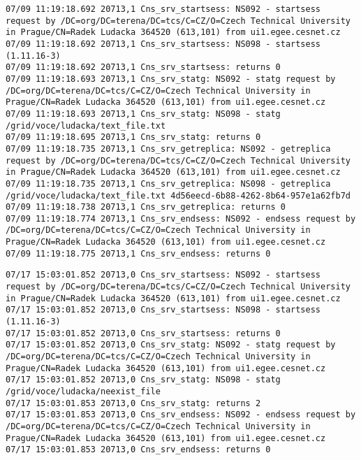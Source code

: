 \documentclass[a4paper, 11pt]{article} %
\begin{document}
\begin{lstlisting}[label={log:cp1},caption={lcg-cp --vo voce lfn:/grid/voce/ludacka/text\_file.txt file://\$PWD/text\_file1.txt}]
07/09 11:19:18.692 20713,1 Cns_srv_startsess: NS092 - startsess request by /DC=org/DC=terena/DC=tcs/C=CZ/O=Czech Technical University in Prague/CN=Radek Ludacka 364520 (613,101) from ui1.egee.cesnet.cz
07/09 11:19:18.692 20713,1 Cns_srv_startsess: NS098 - startsess (1.11.16-3)
07/09 11:19:18.692 20713,1 Cns_srv_startsess: returns 0
07/09 11:19:18.693 20713,1 Cns_srv_statg: NS092 - statg request by /DC=org/DC=terena/DC=tcs/C=CZ/O=Czech Technical University in Prague/CN=Radek Ludacka 364520 (613,101) from ui1.egee.cesnet.cz
07/09 11:19:18.693 20713,1 Cns_srv_statg: NS098 - statg /grid/voce/ludacka/text_file.txt 
07/09 11:19:18.695 20713,1 Cns_srv_statg: returns 0
07/09 11:19:18.735 20713,1 Cns_srv_getreplica: NS092 - getreplica request by /DC=org/DC=terena/DC=tcs/C=CZ/O=Czech Technical University in Prague/CN=Radek Ludacka 364520 (613,101) from ui1.egee.cesnet.cz
07/09 11:19:18.735 20713,1 Cns_srv_getreplica: NS098 - getreplica /grid/voce/ludacka/text_file.txt 4d56eecd-6b88-4262-8b64-957e1a62fb7d
07/09 11:19:18.738 20713,1 Cns_srv_getreplica: returns 0
07/09 11:19:18.774 20713,1 Cns_srv_endsess: NS092 - endsess request by /DC=org/DC=terena/DC=tcs/C=CZ/O=Czech Technical University in Prague/CN=Radek Ludacka 364520 (613,101) from ui1.egee.cesnet.cz
07/09 11:19:18.775 20713,1 Cns_srv_endsess: returns 0
\end{lstlisting}

\begin{lstlisting}[label={log:cp2},caption={lcg-cp --vo voce lfn:/grid/voce/ludacka/neexist\_file file://\$PWD/text\_file5.txt - lcg-cp to download not exists directory}]
07/17 15:03:01.852 20713,0 Cns_srv_startsess: NS092 - startsess request by /DC=org/DC=terena/DC=tcs/C=CZ/O=Czech Technical University in Prague/CN=Radek Ludacka 364520 (613,101) from ui1.egee.cesnet.cz
07/17 15:03:01.852 20713,0 Cns_srv_startsess: NS098 - startsess (1.11.16-3)
07/17 15:03:01.852 20713,0 Cns_srv_startsess: returns 0
07/17 15:03:01.852 20713,0 Cns_srv_statg: NS092 - statg request by /DC=org/DC=terena/DC=tcs/C=CZ/O=Czech Technical University in Prague/CN=Radek Ludacka 364520 (613,101) from ui1.egee.cesnet.cz
07/17 15:03:01.852 20713,0 Cns_srv_statg: NS098 - statg /grid/voce/ludacka/neexist_file 
07/17 15:03:01.853 20713,0 Cns_srv_statg: returns 2
07/17 15:03:01.853 20713,0 Cns_srv_endsess: NS092 - endsess request by /DC=org/DC=terena/DC=tcs/C=CZ/O=Czech Technical University in Prague/CN=Radek Ludacka 364520 (613,101) from ui1.egee.cesnet.cz
07/17 15:03:01.853 20713,0 Cns_srv_endsess: returns 0
\end{lstlisting}
\end{document}
